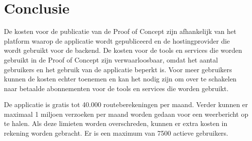 \section{Conclusie}%

De kosten voor de publicatie van de Proof of Concept zijn afhankelijk van het platform waarop de applicatie wordt gepubliceerd en de hostingprovider die wordt gebruikt voor de backend. De kosten voor de tools en services die worden gebruikt in de Proof of Concept zijn verwaarloosbaar, omdat het aantal gebruikers en het gebruik van de applicatie beperkt is. Voor meer gebruikers kunnen de kosten echter toenemen en kan het nodig zijn om over te schakelen naar betaalde abonnementen voor de tools en services die worden gebruikt.

De applicatie is gratis tot 40.000 routeberekeningen per maand. Verder kunnen er maximaal 1 miljoen verzoeken per maand worden gedaan voor een weerbericht op te halen. Als deze limieten worden overschreden, kunnen er extra kosten in rekening worden gebracht. Er is een maximum van 7500 actieve gebruikers.



